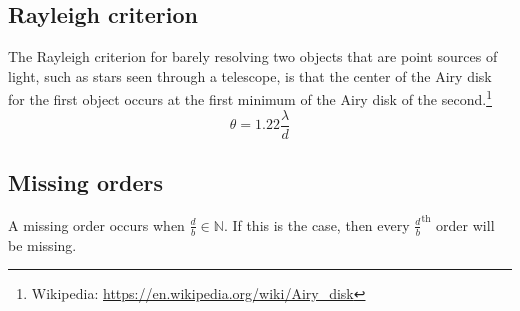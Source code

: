 \documentclass{article}
\begin{document}
\subsection{Rayleigh criterion}
The Rayleigh criterion for barely resolving two objects that are point sources of light, such as stars seen through a telescope, is that the center of the Airy disk for the first object occurs at the first minimum of the Airy disk of the second.\footnote{Wikipedia: \url{https://en.wikipedia.org/wiki/Airy_disk}}
$$\theta=1.22 \frac{\lambda}{d}$$
\subsection{Missing orders}
A missing order occurs when $\frac{d}{b}\in{\mathbb{N}}$.
If this is the case, then every $\frac{d}{b}^{\text{th}}$ order will be missing.
\iffalse
The angle for which this occurs can be calculated by using $$\gamma_{n\cdot\frac{d}{b}}=\left(n\cdot\frac{d}{b}\right)\pi=\frac{1}{2}k d \sin\left({\theta_{n\cdot\frac{d}{b}}}\right)=\frac{\pi}{\lambda_0}n d \sin\left(\theta_{n\cdot\frac{d}{b}}\right)$$
\fi
\end{document}
